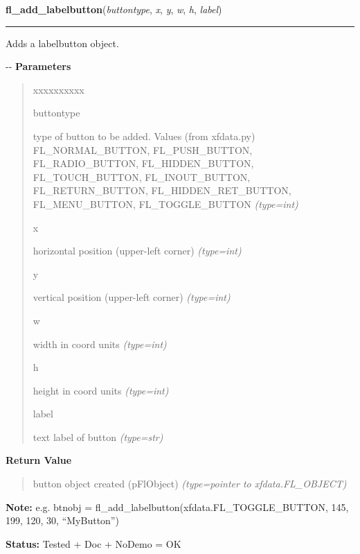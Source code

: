 \hspace{.8\funcindent}\begin{boxedminipage}{\funcwidth}

    \raggedright \textbf{fl\_add\_labelbutton}(\textit{buttontype}, \textit{x}, \textit{y}, \textit{w}, \textit{h}, \textit{label})

    \vspace{-1.5ex}

    \rule{\textwidth}{0.5\fboxrule}
\setlength{\parskip}{2ex}

Adds a labelbutton object.

-{}-
\setlength{\parskip}{1ex}
      \textbf{Parameters}
      \vspace{-1ex}

      \begin{quote}
        \begin{Ventry}{xxxxxxxxxx}

          \item[buttontype]


type of button to be added. Values (from xfdata.py) FL\_NORMAL\_BUTTON,
FL\_PUSH\_BUTTON, FL\_RADIO\_BUTTON, FL\_HIDDEN\_BUTTON, FL\_TOUCH\_BUTTON,
FL\_INOUT\_BUTTON, FL\_RETURN\_BUTTON, FL\_HIDDEN\_RET\_BUTTON,
FL\_MENU\_BUTTON, FL\_TOGGLE\_BUTTON
            {\it (type=int)}

          \item[x]


horizontal position (upper-left corner)
            {\it (type=int)}

          \item[y]


vertical position (upper-left corner)
            {\it (type=int)}

          \item[w]


width in coord units
            {\it (type=int)}

          \item[h]


height in coord units
            {\it (type=int)}

          \item[label]


text label of button
            {\it (type=str)}

        \end{Ventry}

      \end{quote}

      \textbf{Return Value}
    \vspace{-1ex}

      \begin{quote}

button object created (pFlObject)
      {\it (type=pointer to xfdata.FL\_OBJECT)}

      \end{quote}

\textbf{Note:} 
e.g. btnobj = fl\_add\_labelbutton(xfdata.FL\_TOGGLE\_BUTTON, 145,
199, 120, 30, ``MyButton'')


\textbf{Status:} 
Tested + Doc + NoDemo = OK


    \end{boxedminipage}

